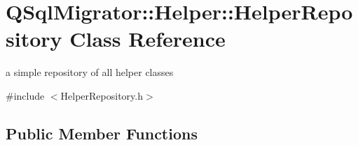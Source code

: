 \hypertarget{class_q_sql_migrator_1_1_helper_1_1_helper_repository}{}\section{Q\+Sql\+Migrator\+:\+:Helper\+:\+:Helper\+Repository Class Reference}
\label{class_q_sql_migrator_1_1_helper_1_1_helper_repository}


a simple repository of all helper classes  




{\ttfamily \#include $<$Helper\+Repository.\+h$>$}

\subsection*{Public Member Functions}
